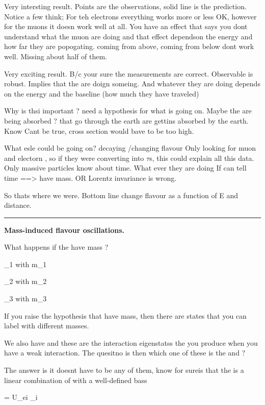 {Very intersting result.
Points are the observations, solid line is the prediction.
Notice a few think; For teh electrons everything works more or less OK, however for the muons it doesn work well at all.
You have an effect that says you dont understand what the muon \nus are doing and that effect dependson the energy and how far they are popogating.
\nus coming from above, \nus coming from below dont work well.  
Missing about half of them.

Very exciting result. B/c your sure the measurements are correct. 
Observable is robust. 
Implies that the \nus are doign someing. 
And whatever they are doing depends on the energy and the baseline (how much they have traveled)

Why is thsi important ? need a hypothesis for what is going on. 
Maybe the \nus are being absorbed ? 
\nus that go through the earth are gettins absorbed by the earth. 
Know Cant be true,  cross section would bave to be too high. 

What esle could be going on?
\nus decaying /changing flavour
Only looking for muon and electorn \nus, so if they were converting into $\tau$s, this could explain all this data.
Only massive particles know about time. 
What ever they are doing 
If \nus can tell time ==> \nus have mass. 
OR Lorentz invariance is wrong. 

So thats where we were. 
Bottom line \nus change flavour as a function of E and distance. 

\noindent\rule{\textwidth}{1pt}

\textbf{Mass-induced flavour oscillations.}

What happens if the \nus have mass ?

\be
\nu_1 \textrm{ with } m_1
\ee

\be
\nu_2 \textrm{ with } m_2
\ee

\be
\nu_3 \textrm{ with } m_3
\ee

If you raise the hypothesis that \nus have mass, then there are \nus states that you can label with different masses.

We also have \nue \numu and \nutau these are the interaction eigenstatss the \nus you produce when you have a weak interaction. 
The quesitno is then which one of these is the \nue \numu and \nutau ?


The answer is it doesnt have to be any of them, know for sureis that the \nue is a linear combination of \nus with a well-defined bass

\be
\nue = U_ei \nu_i
\ee

}
